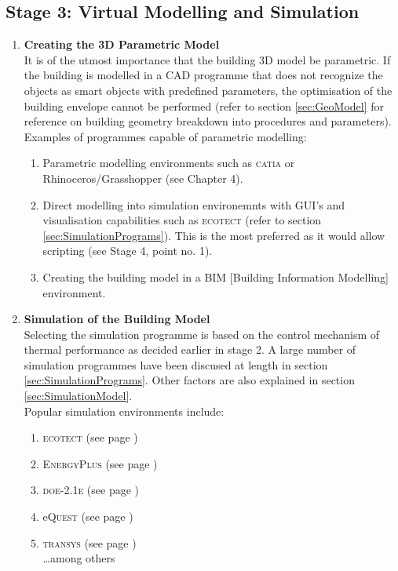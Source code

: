 \clearpage
\colorbox{95Gray}{%
	\begin{minipage}[c][20.5cm][t]{\textwidth}{%
		\subsection{Stage 3: Virtual Modelling and Simulation}
		\vspace{0.5cm}
		\begin{enumerate} \item \textbf{Creating the 3D Parametric Model}\\[3mm] It is of the utmost importance that the building 3D model be parametric. If the building is modelled in a CAD programme that does not recognize the objects as smart objects with predefined parameters, the optimisation of the building envelope cannot be performed (refer to section \ref{sec:GeoModel} for reference on building geometry breakdown into procedures and parameters).\\

				Examples of programmes capable of parametric modelling:
				\begin{enumerate}
					\item Parametric modelling environments such as \textsc{catia} or Rhinoceros/Grasshopper (see Chapter 4).
					\item Direct modelling into simulation environemnts with GUI's and visualisation capabilities such as \textsc{ecotect} (refer to section \ref{sec:SimulationPrograms}). This is the most preferred as it would allow scripting (see Stage 4, point no. 1).
					\item Creating the building model in a BIM [Building Information Modelling] environment.
				\end{enumerate}
				\vspace{0.2cm}
			\item \textbf{Simulation of the Building Model}\\[3mm]
				Selecting the simulation programme is based on the control mechanism of thermal performance as decided earlier in stage 2. A large number of simulation programmes have been discused at length in section \ref{sec:SimulationPrograms}. Other factors are also explained in section \ref{sec:SimulationModel}.\\
				Popular simulation environments include:
				\begin{enumerate}
					\item \textsc{ecotect} (see page \pageref{par:ECOTECT})
					\item \textsc{EnergyPlus} (see page \pageref{par:EnergyPlus})
					\item \textsc{doe-2.1e} (see page \pageref{par:DOE})
					\item e\textsc{Quest} (see page \pageref{par:eQUEST})
					\item \textsc{transys} (see page \pageref{par:TRANSYS})\\
						\ldots among others
				\end{enumerate}
		\end{enumerate}
	}%
\end{minipage}%
}

